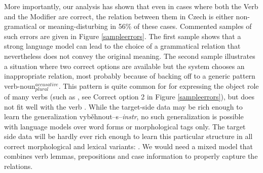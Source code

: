 \documentclass[11pt]{book}
\theoremstyle{plain}
\begin{document}
More
importantly, our analysis has shown that even in cases where both the Verb and
the Modifier are correct, the relation between them in Czech is either
non-gramatical or meaning-disturbing in 56\% of these cases. Commented samples
of such errors are given in Figure \ref{sampleerrors}. The first sample shows
that a strong language model can lead to the choice of a grammatical relation
that nevertheless does not convey the original meaning. The second sample
illustrates a situation where two correct options are available but the
system chooses an inappropriate relation, most probably because of backing off to
a generic pattern verb-noun$_{plural}^{accusative}$. This pattern
is quite common for
for expressing the object role of
many verbs (such as , see Correct
option 2 in Figure \ref{sampleerrors}), but does not fit well with the verb
. While the target-side data
may be rich enough to learn the generalization vyb\v{e}hnout--s--{\it instr},
no
such generalization is possible with language models over word forms or
morphological tags only. The
target side data will be hardly ever rich enough to learn this particular
structure in all correct morphological and lexical variants:
. We would need a 
mixed
model that combines verb lemmas, prepositions and case information to properly
capture the relations.
\end{document}
